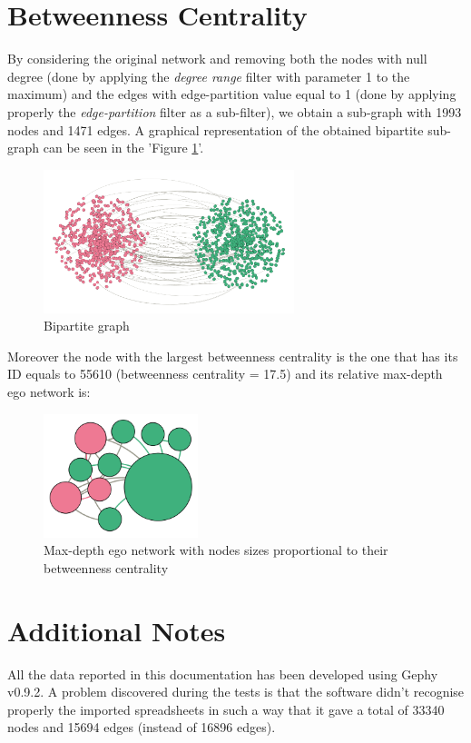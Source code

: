 \documentclass{article}
\begin{document}
\section{Betweenness Centrality}
    By considering the original network and removing both the nodes with null degree (done by applying the \textit{degree range} filter with parameter 1 to the maximum) and the edges with edge-partition value equal to 1 (done by applying properly the \textit{edge-partition} filter as a sub-filter), we obtain a sub-graph with 1993 nodes and 1471 edges.\newline
    A graphical representation of the obtained bipartite sub-graph can be seen in the 'Figure \ref{fig:figure-6.0}'.
    
    \begin{figure}[H]
        \centering
        \includegraphics[width=0.65\textwidth]{6.0.png}
        \caption{Bipartite graph}
        \label{fig:figure-6.0}
    \end{figure}
    
    \noindent Moreover the node with the largest betweenness centrality is the one that has its ID equals to 55610 (betweenness centrality = 17.5) and its relative max-depth ego network is:
    
    \begin{figure}[H]
        \centering
        \includegraphics[width=0.4\textwidth]{6.1.png}
        \caption{Max-depth ego network with nodes sizes proportional to their betweenness centrality}
        \label{fig:figure-6.1}
    \end{figure}
    
\section{Additional Notes}
All the data reported in this documentation has been developed using Gephy v0.9.2.\newline
A problem discovered during the tests is that the software didn't recognise properly the imported spreadsheets in such a way that it gave a total of 33340 nodes and 15694 edges (instead of 16896 edges).
\end{document}
